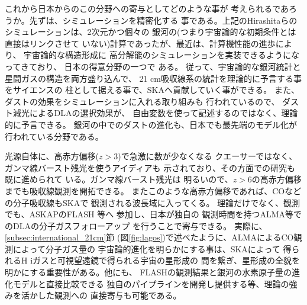 これから日本からのこの分野への寄与としてどのような事が
考えられるであろうか。先ずは、シミュレーションを精密化する
事である。上記のHirashitaらの
シミュレーションは、2次元かつ個々の
銀河の(つまり宇宙論的な初期条件とは直接はリンクさせて
いない)計算であったが、最近は、計算機性能の進歩により、
宇宙論的な構造形成に
高分解能のシミュレーションを実装できるようになってきており、
日本の得意分野の一つで
ある\citep{2013MNRAS.428..718O,2014MNRAS.439.3073Y}。
従って、宇宙論的な銀河統計と星間ガスの構造を両方盛り込んで、
21 cm吸収線系の統計を理論的に予言する事をサイエンスの
柱として据える事で、SKAへ貢献していく事ができる。
また、ダストの効果をシミュレーションに入れる取り組みも
行われている\citep{2014MNRAS.443..522Y}ので、
ダスト減光によるDLAの選択効果が、
自由変数を使って記述するのではなく、理論的に予言できる。
銀河の中でのダストの進化も、日本でも最先端のモデル化が
行われている分野である\citep{2014MNRAS.440..134A}。

光源自体に、高赤方偏移($z>3$)で急激に数が少なくなる
クエーサーではなく、ガンマ線バースト残光を使うアイディアも
示されており、その方面での研究も既に進められて
いる\citep{2007MNRAS.380.1715I}。ガンマ線バースト残光は
明るいので、$z>6$の高赤方偏移までも吸収線観測を開拓できる。
またこのような高赤方偏移であれば、COなどの分子吸収線もSKAで
観測される波長域に入ってくる。
理論だけでなく、観測でも、ASKAPのFLASH
等へ
参加し、日本が独自の
観測時間を持つALMA等でのDLAの分子ガスフォローアップ
を行うことで寄与できる。
実際に、\ref{subsec:international_21cm}節
(図\ref{fig:lagos})で述べたように、ALMAによるCO観測によって分子ガス量の
宇宙論的進化を明らかにする事は、SKAによって
得られるH {\sc i}ガスと可視望遠鏡で得られる宇宙の星形成の
間を繋ぎ、星形成の全貌を明かにする重要性がある。他にも、
FLASHの観測結果と銀河の水素原子量の進化モデルと直接比較できる
独自のパイプラインを開発し提供する等、理論の強みを活かした観測への
直接寄与も可能である。

